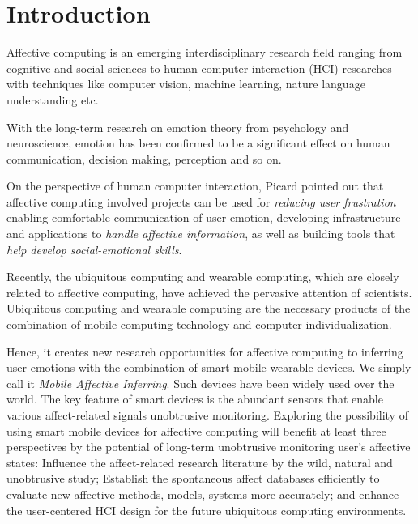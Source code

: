 \section{Introduction}\label{sec:intro}

Affective computing is an emerging interdisciplinary research field ranging from cognitive and social sciences to human computer interaction (HCI) researches with techniques like computer vision, machine learning, nature language understanding etc.

With the long-term research on emotion theory from psychology and neuroscience\cite{james1884emotion, turkle2005second}, emotion has been confirmed to be a significant effect \cite{james2013emotion} on human communication, decision making, perception and so on.

On the perspective of human computer interaction, Picard \cite{picard1999affective} pointed out that affective computing involved projects can be used for \emph{reducing user frustration} enabling comfortable communication of user emotion, developing infrastructure and applications to \emph{handle affective information}, as well as building tools that \emph{help develop social-emotional skills}.

Recently, the ubiquitous computing\cite{weiser1991computer} and wearable computing\cite{starner1996human}, which are closely related to affective computing, have achieved the pervasive attention of scientists. Ubiquitous computing and wearable computing are the necessary products of the combination of mobile computing technology and computer individualization.

Hence, it creates new research opportunities for affective computing to inferring user emotions with the combination of smart mobile wearable devices. We simply call it \emph{Mobile Affective Inferring}. Such devices have been widely used over the world. The key feature of smart devices is the abundant sensors that enable various affect-related signals unobtrusive monitoring. Exploring the possibility of using smart mobile devices for affective computing will benefit at least three perspectives by the potential of long-term unobtrusive monitoring user’s affective states: Influence the affect-related research literature by the wild, natural and unobtrusive study; Establish the spontaneous affect databases efficiently to evaluate new affective methods, models, systems more accurately; and enhance the user-centered HCI design for the future ubiquitous computing environments.

